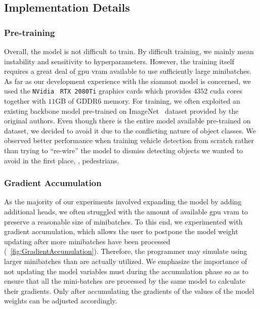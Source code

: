 \subsection{Implementation Details}

\subsubsection{Pre-training}

Overall, the model is not difficult to train. By difficult training, we mainly mean instability and sensitivity to hyperparameters. However, the training itself requires a great deal of \gls{gpu} \gls{vram} available to use sufficiently large minibatches. As far as our development experience with the \gls{siammot} model is concerned, we used the \texttt{NVidia}~\cite{webnvidia} \texttt{RTX 2080Ti} graphics cards which provides $4352$ \gls{cuda} cores together with $11$GB of GDDR6 memory. For training, we often exploited an existing backbone model pre-trained on ImageNet~\cite{deng2009imagenet} dataset provided by the original authors. Even though there is the entire model available pre-trained on \mscoco{}~\cite{lin2014mscoco} dataset, we decided to avoid it due to the conflicting nature of object classes. We observed better performance when training vehicle detection from scratch rather than trying to ``re-wire'' the model to dismiss detecting objects we wanted to avoid in the first place, \egtext{}, pedestrians.

\subsubsection{Gradient Accumulation}

As the majority of our experiments involved expanding the model by adding additional heads, we often struggled with the amount of available \gls{gpu} \gls{vram} to preserve a reasonable size of minibatches. To this end, we experimented with gradient accumulation, which allows the user to postpone the model weight updating after more minibatches have been processed (\figtext{}~\ref{fig:GradientAccumulation}). Therefore, the programmer may simulate using larger minibatches than are actually utilized. We emphasize the importance of not updating the model variables must during the accumulation phase so as to ensure that all the mini-batches are processed by the same model to calculate their gradients. Only after accumulating the gradients of the values of the model weights can be adjusted accordingly.

